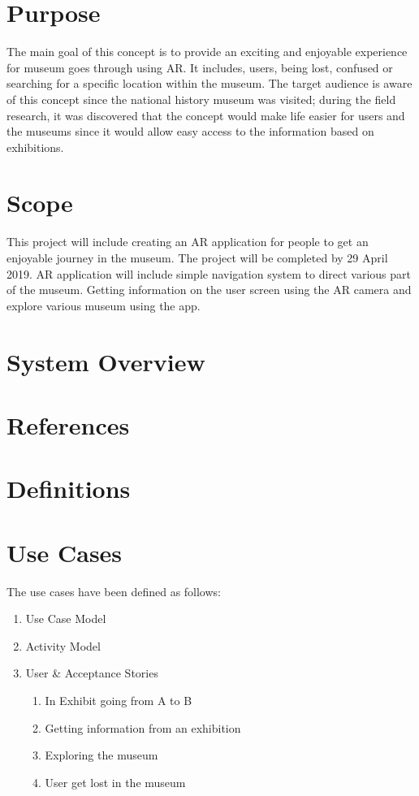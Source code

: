 
\section{Purpose}
The main goal of this concept is to provide an exciting and enjoyable experience for museum goes through using AR. It includes, users, being lost, confused or searching for a specific location within the museum. The target audience is aware of this concept since the national history museum was visited; during the field research, it was discovered that the concept would make life easier for users and the museums since it would allow easy access to the information based on exhibitions.

\section{Scope}
This project will include creating an AR application for people to get an enjoyable journey in the museum. The project will be completed by 29 April 2019. AR application will include simple navigation system to direct various part of the museum. Getting information on the user screen using the AR camera and explore various museum using the app. 

\section{System Overview}

\section{References}

\section{Definitions}

\section{Use Cases}
The use cases have been defined as follows:
\begin{enumerate}
    \item Use Case Model
    \item Activity Model
    \item User & Acceptance Stories
    \begin{enumerate}
        \item In Exhibit going from A to B
        \item Getting information from an exhibition
        \item Exploring the museum
        \item User get lost in the museum
    \end{enumerate}
\end{enumerate}


